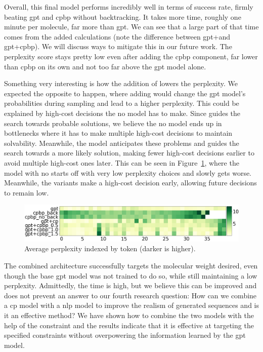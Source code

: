 \documentclass[../Document.tex]{subfiles}
\begin{document}
Overall, this final model performs incredibly well in terms of success rate, firmly beating \gls{gpt} and \gls{cpbp} without backtracking.
It takes more time, roughly one minute per molecule, far more than \gls{gpt}. We can see that a large part of that time comes from the added \bp calculations (note the difference between \gls{gpt}+\cp and \gls{gpt}+\gls{cpbp}). We will discuss ways to mitigate this in our future work.
The perplexity score stays pretty low even after adding the \gls{cpbp} component, far lower than \gls{cpbp} on its own and not too far above the \gls{gpt} model alone. 

Something very interesting is how the addition of \bp lowers the perplexity.
We expected the opposite to happen, where adding \bp would change the \gls{gpt} model's probabilities during sampling and lead to a higher perplexity.
This could be explained by high-cost decisions the no \bp model has to make.
Since \bp guides the search towards probable solutions, we believe the no \bp model ends up in bottlenecks where it has to make multiple high-cost decisions to maintain solvability. Meanwhile, the \bp model anticipates these problems and guides the search towards a more likely solution, making fewer high-cost decisions earlier to avoid multiple high-cost ones later.
This can be seen in Figure~\ref{fig:molecule-heatmap}, where the model with no \bp starts off with very low perplexity choices and slowly gets worse. Meanwhile, the \bp variants make a high-cost decision early, allowing future decisions to remain low.

\begin{figure}[h]
    \centering
    \includegraphics[width=1.0\linewidth]{images/heatmaps.png}
    \caption[Average perplexity indexed by token (darker is higher).]{Average perplexity indexed by token (darker is higher).}
    \label{fig:molecule-heatmap}
\end{figure}

The combined architecture successfully targets the molecular weight desired, even though the base \gls{gpt} model was not trained to do so, while still maintaining a low perplexity.
Admittedly, the time is high, but we believe this can be improved and does not prevent an answer to our fourth research question: How can we combine a \acrshort{cp} model with a \acrshort{nlp} model to improve the realism of generated sequences and is it an effective method?
We have shown how to combine the two models with the help of the \oracle constraint and the results indicate that it is effective at targeting the specified constraints without overpowering the information learned by the \gls{gpt} model.
\end{document}
